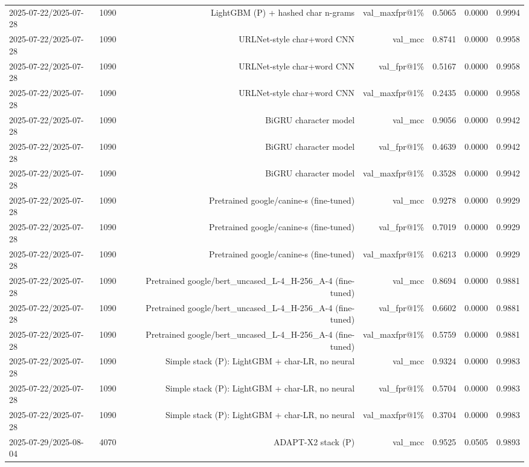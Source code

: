 \begin{table}[t]
\begin{tabular}{llrrrrr}
2025-07-22/2025-07-28 & 1090 & LightGBM (P) + hashed char n-grams & val\_maxfpr@1\% & 0.5065 & 0.0000 & 0.9994 \\
2025-07-22/2025-07-28 & 1090 & URLNet-style char+word CNN & val\_mcc & 0.8741 & 0.0000 & 0.9958 \\
2025-07-22/2025-07-28 & 1090 & URLNet-style char+word CNN & val\_fpr@1\% & 0.5167 & 0.0000 & 0.9958 \\
2025-07-22/2025-07-28 & 1090 & URLNet-style char+word CNN & val\_maxfpr@1\% & 0.2435 & 0.0000 & 0.9958 \\
2025-07-22/2025-07-28 & 1090 & BiGRU character model & val\_mcc & 0.9056 & 0.0000 & 0.9942 \\
2025-07-22/2025-07-28 & 1090 & BiGRU character model & val\_fpr@1\% & 0.4639 & 0.0000 & 0.9942 \\
2025-07-22/2025-07-28 & 1090 & BiGRU character model & val\_maxfpr@1\% & 0.3528 & 0.0000 & 0.9942 \\
2025-07-22/2025-07-28 & 1090 & Pretrained google/canine-s (fine-tuned) & val\_mcc & 0.9278 & 0.0000 & 0.9929 \\
2025-07-22/2025-07-28 & 1090 & Pretrained google/canine-s (fine-tuned) & val\_fpr@1\% & 0.7019 & 0.0000 & 0.9929 \\
2025-07-22/2025-07-28 & 1090 & Pretrained google/canine-s (fine-tuned) & val\_maxfpr@1\% & 0.6213 & 0.0000 & 0.9929 \\
2025-07-22/2025-07-28 & 1090 & Pretrained google/bert\_uncased\_L-4\_H-256\_A-4 (fine-tuned) & val\_mcc & 0.8694 & 0.0000 & 0.9881 \\
2025-07-22/2025-07-28 & 1090 & Pretrained google/bert\_uncased\_L-4\_H-256\_A-4 (fine-tuned) & val\_fpr@1\% & 0.6602 & 0.0000 & 0.9881 \\
2025-07-22/2025-07-28 & 1090 & Pretrained google/bert\_uncased\_L-4\_H-256\_A-4 (fine-tuned) & val\_maxfpr@1\% & 0.5759 & 0.0000 & 0.9881 \\
2025-07-22/2025-07-28 & 1090 & Simple stack (P): LightGBM + char-LR, no neural & val\_mcc & 0.9324 & 0.0000 & 0.9983 \\
2025-07-22/2025-07-28 & 1090 & Simple stack (P): LightGBM + char-LR, no neural & val\_fpr@1\% & 0.5704 & 0.0000 & 0.9983 \\
2025-07-22/2025-07-28 & 1090 & Simple stack (P): LightGBM + char-LR, no neural & val\_maxfpr@1\% & 0.3704 & 0.0000 & 0.9983 \\
2025-07-29/2025-08-04 & 4070 & ADAPT-X2 stack (P) & val\_mcc & 0.9525 & 0.0505 & 0.9893 \\

\end{tabular}
\end{table}
